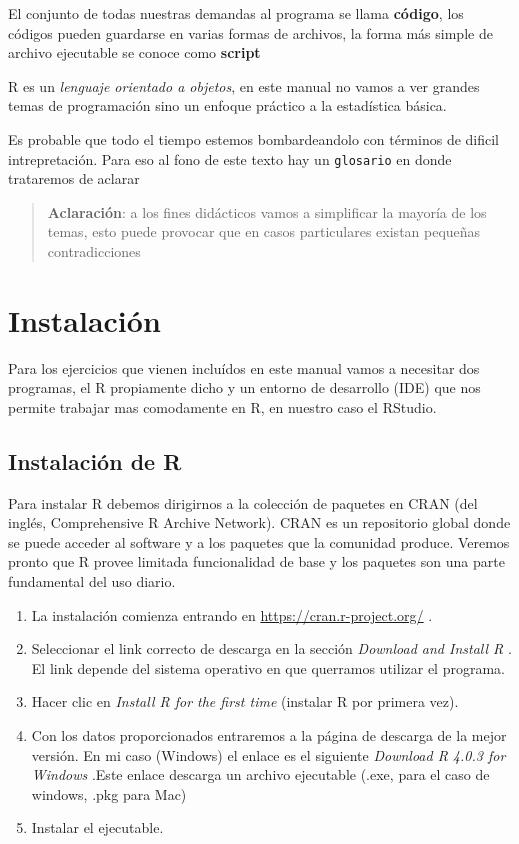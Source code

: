 \documentclass[
]{book}
\providecommand{\tightlist}{%
  \setlength{\itemsep}{0pt}\setlength{\parskip}{0pt}}
\begin{document}
El conjunto de todas nuestras demandas al programa se llama \textbf{código}, los códigos pueden guardarse en varias formas de archivos, la forma más simple de archivo ejecutable se conoce como \textbf{script}

R es un \emph{lenguaje orientado a objetos}, en este manual no vamos a ver grandes temas de programación sino un enfoque práctico a la estadística básica.

Es probable que todo el tiempo estemos bombardeandolo con términos de dificil intrepretación. Para eso al fono de este texto hay un \texttt{glosario} en donde trataremos de aclarar

\begin{quote}
\textbf{Aclaración}: a los fines didácticos vamos a simplificar la mayoría de los temas, esto puede provocar que en casos particulares existan pequeñas contradicciones
\end{quote}

\hypertarget{instalaciuxf3n}{%
\section{Instalación}\label{instalaciuxf3n}}

Para los ejercicios que vienen incluídos en este manual vamos a necesitar dos programas, el R propiamente dicho y un entorno de desarrollo (IDE) que nos permite trabajar mas comodamente en R, en nuestro caso el RStudio.

\hypertarget{instalaciuxf3n-de-r}{%
\subsection{Instalación de R}\label{instalaciuxf3n-de-r}}

Para instalar R debemos dirigirnos a la colección de paquetes en CRAN (del inglés, Comprehensive R Archive Network). CRAN es un repositorio global donde se puede acceder al software y a los paquetes que la comunidad produce. Veremos pronto que R provee limitada funcionalidad de base y los paquetes son una parte fundamental del uso diario.

\begin{enumerate}
\def\labelenumi{\arabic{enumi}.}
\tightlist
\item
  La instalación comienza entrando en \url{https://cran.r-project.org/} .
\item
  Seleccionar el link correcto de descarga en la sección \emph{Download and Install R} . El link depende del sistema operativo en que querramos utilizar el programa.
\item
  Hacer clic en \emph{Install R for the first time} (instalar R por primera vez).
\item
  Con los datos proporcionados entraremos a la página de descarga de la mejor versión. En mi caso (Windows) el enlace es el siguiente \emph{Download R 4.0.3 for Windows} .Este enlace descarga un archivo ejecutable (.exe, para el caso de windows, .pkg para Mac)
\item
  Instalar el ejecutable.
\end{enumerate}
\end{document}
